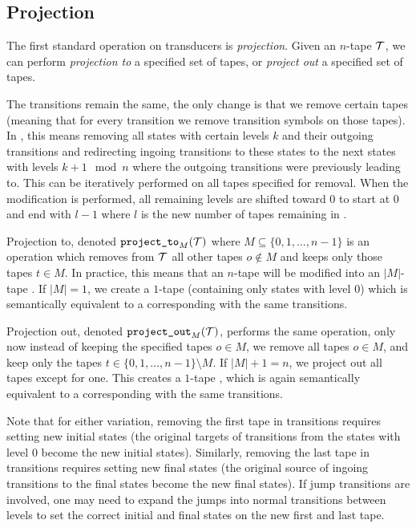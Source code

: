 \subsection{Projection}

The first standard operation on transducers is \emph{projection}.
Given an $n$-tape \nft $\mathcal{T}$, we can perform \emph{projection to} a specified set of tapes, or \emph{project out} a specified set of tapes.

The transitions remain the same, the only change is that we remove certain tapes (meaning that for every \nft transition we remove transition symbols on those tapes).
In \mata, this means removing all states with certain levels $k$ and their outgoing transitions and redirecting ingoing transitions to these states to the next states with levels $k + 1 \mod n$ where the outgoing transitions were previously leading to.
This can be iteratively performed on all tapes specified for removal.
When the modification is performed, all remaining levels are shifted toward $0$ to start at $0$ and end with $l - 1$ where $l$ is the new number of tapes remaining in \nft.

Projection to, denoted $\texttt{project\_to}_{M}(\mathcal{T})$ where $M \subseteq \{ 0, 1, \ldots, n - 1 \} $ is an operation which removes from $\mathcal{T}$ all other tapes $o \notin M$ and keeps only those tapes $t \in M$.
In practice, this means that an $n$-tape \nft will be modified into an $|M|$-tape \nft.
If $|M| = 1$, we create a $1$-tape \nft (containing only states with level $0$) which is semantically equivalent to a corresponding \nfa with the same transitions.

Projection out, denoted $\texttt{project\_out}_{M}(\mathcal{T})$, performs the same operation, only now instead of keeping the specified tapes $o \in M$, we remove all tapes $o \in M$, and keep only the tapes $t \in \{ 0, 1, \ldots, n - 1 \} \setminus M$.
If $|M| + 1 = n$, we project out all tapes except for one.
This creates a $1$-tape \nft, which is again semantically equivalent to a corresponding \nfa with the same transitions.

Note that for either variation, removing the first tape in \nft transitions requires setting new initial states (the original targets of transitions from the states with level $0$ become the new initial states).
Similarly, removing the last tape in \nft transitions requires setting new final states (the original source of ingoing transitions to the final states become the new final states).
If jump transitions are involved, one may need to expand the jumps into normal transitions between levels to set the correct initial and final states on the new first and last tape.

